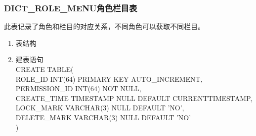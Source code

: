 \subsubsection{DICT\_ROLE\_MENU角色栏目表}
此表记录了角色和栏目的对应关系，不同角色可以获取不同栏目。
\begin{enumerate}
    \item 表结构
    \begin{table}[htbp]
        \centering
        \end{table}
    \item 建表语句\\
        CREATE TABLE(\\
            ROLE\_ID INT(64) PRIMARY KEY AUTO\_INCREMENT,\\
            PERMISSION\_ID INT(64) NOT NULL, \\
            CREATE\_TIME TIMESTAMP NULL DEFAULT CURRENTTIMESTAMP,\\
            LOCK\_MARK VARCHAR(3) NULL DEFAULT 'NO', \\            
            DELETE\_MARK VARCHAR(3) NULL DEFAULT 'NO'\\
        )
    \end{enumerate}

